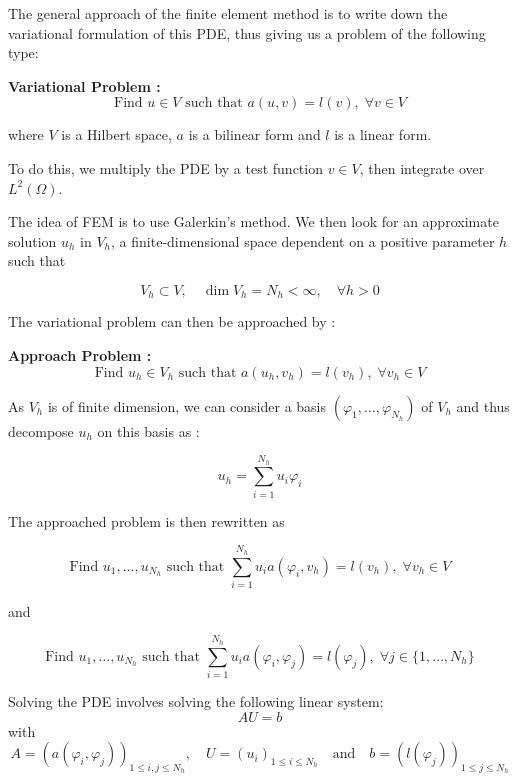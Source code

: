 The general approach of the finite element method is to write down the variational formulation of this PDE, thus giving us a problem of the following type:

\textbf{Variational Problem :}
\begin{equation*}
	\text{Find } u\in V \text{ such that } a(u,v)=l(v), \;\forall v\in V
\end{equation*}

where $V$ is a Hilbert space, $a$ is a bilinear form and $l$ is a linear form.

To do this, we multiply the PDE by a test function $v\in V$, then integrate over $L^2(\Omega)$.

The idea of FEM is to use Galerkin's method. We then look for an approximate solution $u_h$ in $V_h$, a finite-dimensional space dependent on a positive parameter $h$ such that

\begin{equation*}
	V_h\subset V, \quad \dim V_h = N_h<\infty, \quad \forall h>0
\end{equation*}

The variational problem can then be approached by :

\textbf{Approach Problem :}
\begin{equation*}
	\text{Find } u_h\in V_h \text{ such that } a(u_h,v_h)=l(v_h), \;\forall v_h\in V
\end{equation*}

As $V_h$ is of finite dimension, we can consider a basis $(\varphi_1,\dots,\varphi_{N_h})$ of $V_h$ and thus decompose $u_h$ on this basis as :

\begin{equation}
	\label{decomp1}
	u_h=\sum_{i=1}^{N_h}u_i\varphi_i	
\end{equation}

The approached problem is then rewritten as

\begin{equation*}
	\text{Find } u_1,\dots,u_{N_h} \text{ such that } \sum_{i=1}^{N_h}u_i a(\varphi_i,v_h)=l(v_h), \;\forall v_h\in V 
\end{equation*}

and

\begin{equation*}
	\text{Find } u_1,\dots,u_{N_h} \text{ such that } \sum_{i=1}^{N_h}u_i a(\varphi_i,\varphi_j)=l(\varphi_j), \;\forall j\in \{1,\dots,N_h\}
\end{equation*}

Solving the PDE involves solving the following linear system:
\begin{equation*}
	AU=b
\end{equation*}
with
\begin{equation*}
	A=(a(\varphi_i,\varphi_j))_{1\le i,j\le N_h}, \quad U=(u_i)_{1\le i\le N_h} \quad \text{and} \quad b=(l(\varphi_j))_{1\le j\le N_h}
\end{equation*}

